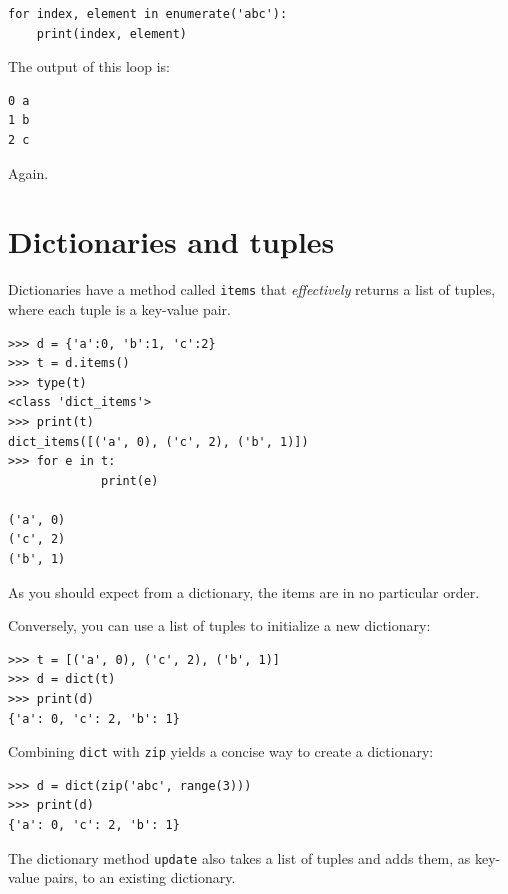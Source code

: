 \documentclass[10pt]{book}
\begin{document}

\beforeverb
\begin{verbatim}
for index, element in enumerate('abc'):
    print(index, element)
\end{verbatim}
\afterverb
%
The output of this loop is:

\beforeverb
\begin{verbatim}
0 a
1 b
2 c
\end{verbatim}
\afterverb
%
Again.


\section{Dictionaries and tuples}


Dictionaries have a method called {\tt items} that {\em effectively} returns a list of
tuples, where each tuple is a key-value pair.

\beforeverb
\begin{verbatim}
>>> d = {'a':0, 'b':1, 'c':2}
>>> t = d.items()
>>> type(t)
<class 'dict_items'>
>>> print(t)
dict_items([('a', 0), ('c', 2), ('b', 1)])
>>> for e in t:
             print(e)

('a', 0)
('c', 2)
('b', 1)
\end{verbatim}
\afterverb
%
As you should expect from a dictionary, the items are in no
particular order.


Conversely, you can use a list of tuples to initialize
a new dictionary:

\beforeverb
\begin{verbatim}
>>> t = [('a', 0), ('c', 2), ('b', 1)]
>>> d = dict(t)
>>> print(d)
{'a': 0, 'c': 2, 'b': 1}
\end{verbatim}
\afterverb

Combining {\tt dict} with {\tt zip} yields a concise way
to create a dictionary:


\beforeverb
\begin{verbatim}
>>> d = dict(zip('abc', range(3)))
>>> print(d)
{'a': 0, 'c': 2, 'b': 1}
\end{verbatim}
\afterverb
%
The dictionary method {\tt update} also takes a list of tuples
and adds them, as key-value pairs, to an existing dictionary.
\end{document}
